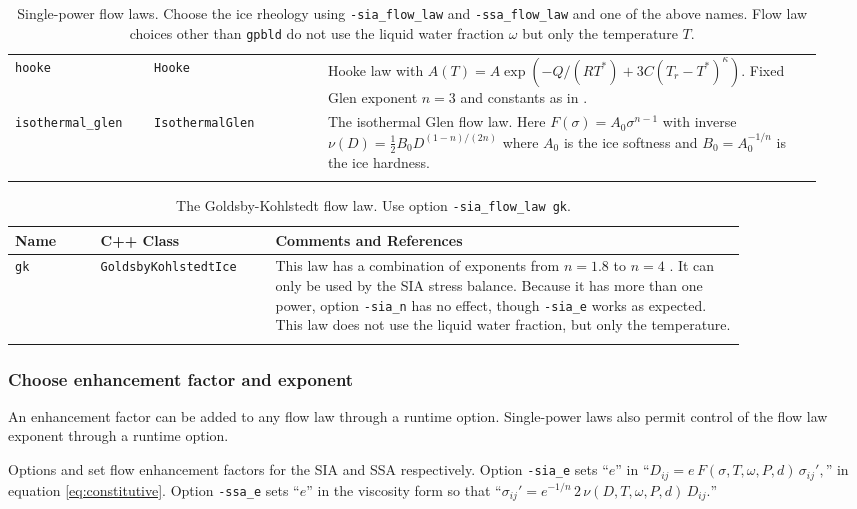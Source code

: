 \begin{table}[ht]
\begin{tabular}{p{0.16\linewidth}p{0.2\linewidth}p{0.58\linewidth}}
\texttt{hooke} & \texttt{Hooke} & Hooke law with \mbox{$A(T) = A \exp(-Q/(RT^*) + 3C (T_r - T^*)^\kappa)$.}  Fixed Glen exponent $n=3$ and constants as in \cite{Hooke,PayneBaldwin}.\\
\texttt{isothermal_glen} &  \texttt{IsothermalGlen} & The isothermal Glen flow law.  Here $F(\sigma) = A_0 \sigma^{n-1}$ with inverse $\nu(D) = \frac{1}{2} B_0 D^{(1-n)/(2n)}$ where $A_0$ is the ice softness and $B_0=A_0^{-1/n}$ is the ice hardness. \\
\bottomrule
\normalsize	
\end{tabular}
\caption{Single-power flow laws.  Choose the ice rheology using \texttt{-sia_flow_law} and \texttt{-ssa_flow_law} and one of the above names.  Flow law choices other than \texttt{gpbld} do not use the liquid water fraction $\omega$ but only the temperature $T$.}
\label{tab:flowlaw}
\end{table}

\begin{table}[ht]
\centering
{}
\small
\begin{tabular}{p{0.1\linewidth}p{0.2\linewidth}p{0.55\linewidth}}\toprule
\textbf{Name} & C++ Class & \textbf{Comments and References} \\ \midrule
\texttt{gk} & \texttt{GoldsbyKohlstedtIce} & This law has a combination of exponents from $n=1.8$ to $n=4$ \cite{GoldsbyKohlstedt}.  It can only be used by the SIA stress balance.  Because it has more than one power, option \texttt{-sia_n} has no effect, though \texttt{-sia_e} works as expected.  This law does not use the liquid water fraction, but only the temperature. \\
\bottomrule
\normalsize	
\end{tabular}
\caption{The Goldsby-Kohlstedt flow law. Use option \texttt{-sia_flow_law gk}.}
\label{tab:flowlawgk}
\end{table}


\subsubsection*{Choose enhancement factor and exponent}  An enhancement factor can be added to any flow law through a runtime option.  Single-power laws also permit control of the flow law exponent through a runtime option.

Options  and  set flow enhancement factors for the SIA and SSA respectively.  Option \texttt{-sia_e} sets ``$e$'' in ``$D_{ij} = e\, F(\sigma,T,\omega,P,d)\, \sigma_{ij}',$'' in equation \eqref{eq:constitutive}.  Option \texttt{-ssa_e} sets ``$e$'' in the viscosity form so that ``$\sigma_{ij}'  = e^{-1/n}\, 2\, \nu(D,T,\omega,P,d)\, D_{ij}.$''

